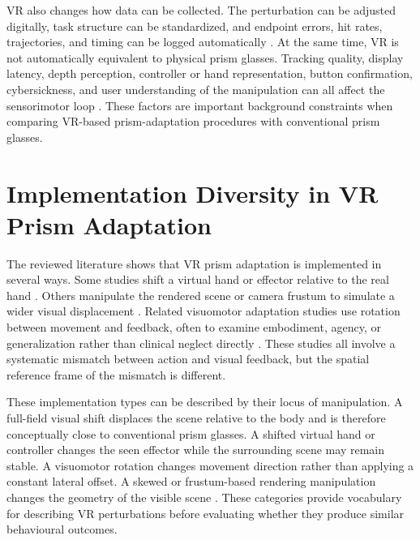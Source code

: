 VR also changes how data can be collected. The perturbation can be adjusted digitally, task structure can be standardized, and endpoint errors, hit rates, trajectories, and timing can be logged automatically \cite{cho2022feasibility,anan2025comparative}. At the same time, VR is not automatically equivalent to physical prism glasses. Tracking quality, display latency, depth perception, controller or hand representation, button confirmation, cybersickness, and user understanding of the manipulation can all affect the sensorimotor loop \cite{cho2022feasibility,gerken2025sense,Cybersickness}. These factors are important background constraints when comparing VR-based prism-adaptation procedures with conventional prism glasses.

\section{Implementation Diversity in VR Prism Adaptation}
\label{sec:background-implementation-diversity}

The reviewed literature shows that VR prism adaptation is implemented in several ways. Some studies shift a virtual hand or effector relative to the real hand \cite{kim2017development,cho2022feasibility,Bourgeois2021}. Others manipulate the rendered scene or camera frustum to simulate a wider visual displacement \cite{Ramos2019,anan2025comparative}. Related visuomotor adaptation studies use rotation between movement and feedback, often to examine embodiment, agency, or generalization rather than clinical neglect directly \cite{gerken2025sense}. These studies all involve a systematic mismatch between action and visual feedback, but the spatial reference frame of the mismatch is different.

These implementation types can be described by their locus of manipulation. A full-field visual shift displaces the scene relative to the body and is therefore conceptually close to conventional prism glasses. A shifted virtual hand or controller changes the seen effector while the surrounding scene may remain stable. A visuomotor rotation changes movement direction rather than applying a constant lateral offset. A skewed or frustum-based rendering manipulation changes the geometry of the visible scene \cite{Ramos2019}. These categories provide vocabulary for describing VR perturbations before evaluating whether they produce similar behavioural outcomes.

